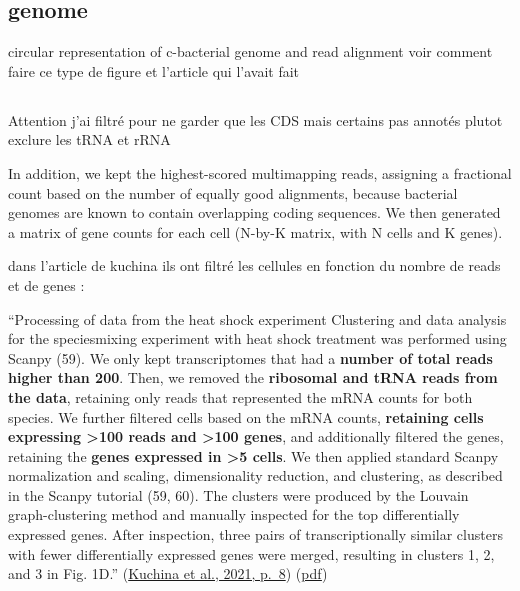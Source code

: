 \documentclass[
  11pt,
  a4paper,
]{report}
\begin{document}
\subsection{genome}\label{genome-1}

circular representation of c-bacterial genome and read alignment voir
comment faire ce type de figure et l'article qui l'avait fait

\subsection{}\label{section-1}

Attention j'ai filtré pour ne garder que les CDS mais certains pas
annotés plutot exclure les tRNA et rRNA

In addition, we kept the highest-scored multimapping reads, assigning a
fractional count based on the number of equally good alignments, because
bacterial genomes are known to contain overlapping coding sequences. We
then generated a matrix of gene counts for each cell (N-by-K matrix,
with N cells and K genes).

dans l'article de kuchina ils ont filtré les cellules en fonction du
nombre de reads et de genes :

``Processing of data from the heat shock experiment Clustering and data
analysis for the speciesmixing experiment with heat shock treatment was
performed using Scanpy (59). We only kept transcriptomes that had a
\textbf{number of total reads higher than 200}. Then, we removed the
\textbf{ribosomal and tRNA reads from the data}, retaining only reads
that represented the mRNA counts for both species. We further filtered
cells based on the mRNA counts, \textbf{retaining cells expressing
\textgreater100 reads and \textgreater100 genes}, and additionally
filtered the genes, retaining the \textbf{genes expressed in
\textgreater5 cells}. We then applied standard Scanpy normalization and
scaling, dimensionality reduction, and clustering, as described in the
Scanpy tutorial (59, 60). The clusters were produced by the Louvain
graph-clustering method and manually inspected for the top
differentially expressed genes. After inspection, three pairs of
transcriptionally similar clusters with fewer differentially expressed
genes were merged, resulting in clusters 1, 2, and 3 in Fig. 1D.''
(\href{zotero://select/library/items/AWDKBVJW}{Kuchina et al., 2021,
p.~8})
(\href{zotero://open-pdf/library/items/YFM8QJY6?page=9&annotation=LXF2XHIY}{pdf})

\end{document}
